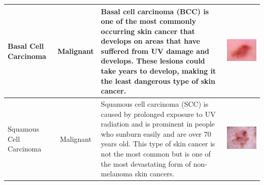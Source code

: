 \documentclass[12pt]{report}
\begin{document}
{\begin{tabular}{|m{3cm}|c|m{15cm}|m{3cm}|}
	\\
	\hline
	Basal Cell Carcinoma & Malignant & 
	Basal cell carcinoma (BCC) is one of the most commonly occurring skin cancer that develops on areas that have suffered from UV damage and develops. These lesions could take years to develop, making it the least dangerous type of skin cancer.  & 
	\includegraphics[scale=0.15]{figure-3-bcc.jpg} 
	\\
	\hline
	Squamous Cell Carcinoma & Malignant & 
	Squamous cell carcinoma (SCC) is caused by prolonged exposure to UV radiation and is prominent in people who sunburn easily and are over 70 years old. This type of skin cancer is not the most common but is one of the most devastating form of non-melanoma skin cancers. & 
	\includegraphics[scale=0.15]{figure-3-scc.jpg} 

\end{tabular}}
\end{document}

